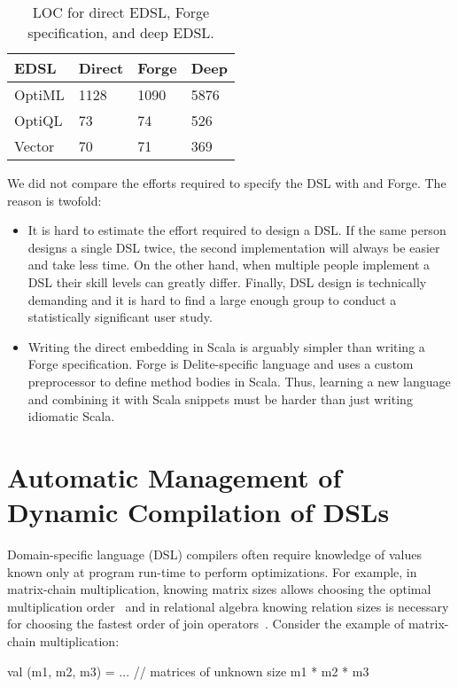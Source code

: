 \begin{table}[ht]
\caption{LOC for direct EDSL, Forge specification, and deep EDSL.}
\label{tbl:deepgen}
\centering
\begin{tabularx}{\linewidth}{ X X X X }
\toprule
 EDSL       &   Direct      &     Forge     &   Deep      \\ \midrule
OptiML      &   1128        &     1090    &   5876      \\
OptiQL      &   73          &     74      &   526       \\
Vector      &   70          &     71      &   369       \\
\bottomrule
\end{tabularx}
\end{table}

We did not compare the efforts required to specify the DSL with \yy and Forge. The
reason is twofold:
\begin{itemize}

\item It is hard to estimate the effort required to design a DSL. If the same
person designs a single DSL twice, the second implementation will always be
easier and take less time. On the other hand, when multiple people implement a DSL their skill levels
can greatly differ. Finally, DSL design is technically demanding and it is hard to find
a large enough group to conduct a statistically significant user
study.

\item Writing the direct embedding in Scala is arguably simpler than writing a
Forge specification. Forge is Delite-specific language and uses a custom
preprocessor to define method bodies in Scala. Thus, learning a new language and
combining it with Scala snippets must be harder than just writing idiomatic
Scala.
\end{itemize}


\chapter{Automatic Management of Dynamic Compilation of DSLs }
\label{sec:dynamic-compilation}

Domain-specific language (DSL) compilers often require knowledge of values known only
 at program run-time to perform optimizations. For example,
 in matrix-chain multiplication, knowing matrix sizes allows choosing the
 optimal multiplication order~\cite[Ch.~15.2]{cormen2001introduction} and
 in relational algebra knowing relation sizes is necessary for choosing
 the fastest order of join operators~\cite{selinger1979access}. Consider the example
 of matrix-chain multiplication:\begin{lstparagraph}
  val (m1, m2, m3) = ... // matrices of unknown size
  m1 * m2 * m3
\end{lstparagraph}

